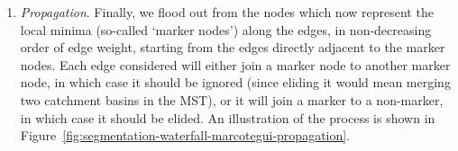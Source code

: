 \begin{enumerate}
\item \emph{Propagation}. Finally, we flood out from the nodes which now represent the local minima (so-called `marker nodes') along the edges, in non-decreasing order of edge weight, starting from the edges directly adjacent to the marker nodes. Each edge considered will either join a marker node to another marker node, in which case it should be ignored (since eliding it would mean merging two catchment basins in the MST), or it will join a marker to a non-marker, in which case it should be elided. An illustration of the process is shown in Figure~\ref{fig:segmentation-waterfall-marcotegui-propagation}.

\begin{figure}[p]
\begin{center}
	\hspace{4mm}%
	\hspace{4mm}%
\end{center}
\end{figure}
\end{enumerate}
